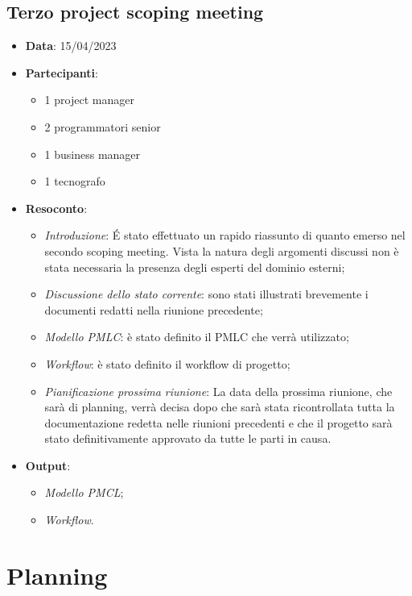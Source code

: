 \documentclass{article}
\begin{document}
  \subsection{Terzo project scoping meeting}
  \begin{itemize}
    \item \textbf{Data}: 15/04/2023
    \item \textbf{Partecipanti}:
    \begin{itemize}
      \item 1 project manager
      \item 2 programmatori senior
      \item 1 business manager
      \item 1 tecnografo
    \end{itemize}
    \item \textbf{Resoconto}:
    \begin{itemize}
      \item \emph{Introduzione}: É stato effettuato un rapido riassunto di quanto emerso nel 
        secondo scoping meeting. Vista la natura degli argomenti discussi non è stata necessaria la presenza
        degli esperti del dominio esterni;
      \item \emph{Discussione dello stato corrente}: sono stati illustrati brevemente i documenti redatti 
        nella riunione precedente;
      \item \emph{Modello PMLC}: è stato definito il PMLC che verrà utilizzato;
      \item \emph{Workflow}: è stato definito il workflow di progetto;
      \item \emph{Pianificazione prossima riunione}: La data della prossima riunione, che sarà di planning,
        verrà decisa dopo che sarà stata ricontrollata tutta la documentazione redetta nelle riunioni precedenti
        e che il progetto sarà stato definitivamente approvato da tutte le parti in causa.
    \end{itemize}
    \item \textbf{Output}:
    \begin{itemize}
      \item \emph{Modello PMCL};
      \item \emph{Workflow}.
    \end{itemize}
  \end{itemize}


  \newpage
  \section{Planning}
\end{document}
